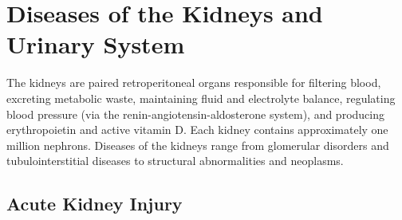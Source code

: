 \chapter{Diseases of the Kidneys and Urinary System}
\label{ch:kidneys}
The kidneys are paired retroperitoneal organs responsible for filtering blood, excreting metabolic waste, maintaining fluid and electrolyte balance, regulating blood pressure (via the renin-angiotensin-aldosterone system), and producing erythropoietin and active vitamin D. Each kidney contains approximately one million nephrons. Diseases of the kidneys range from glomerular disorders and tubulointerstitial diseases to structural abnormalities and neoplasms.

\section{Acute Kidney Injury}








\label{sec:section:Acute Kidney Injury}


